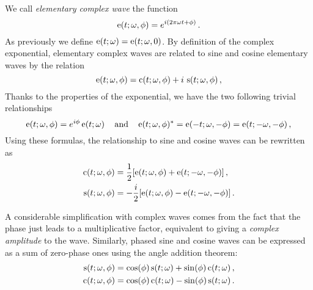 \begin{definition}
  \label{def:complex-wave}
  We call \emph{elementary complex wave} the function
  \begin{equation}
    \operatorname{e}(t;\omega,\phi)=e^{i(2\pi\omega t + \phi)}\,.
  \end{equation}
  As previously we define $\operatorname{e}(t;\omega)=\operatorname{e}(t;\omega,0)$. By definition of the complex
  exponential, elementary complex waves are related to sine and cosine elementary waves by
  the relation
  \begin{equation}
    \operatorname{e}(t;\omega,\phi)=\operatorname{c}(t;\omega,\phi)+i\,\operatorname{s}(t;\omega,\phi)\,,
  \end{equation}
  Thanks to the properties of the exponential, we have the two following trivial
  relationships
  \begin{equation}
    \operatorname{e}(t;\omega,\phi)=e^{i\phi}\operatorname{e}(t;\omega)\,\quad\text{and}\quad
    \operatorname{e}(t;\omega,\phi)^*=\operatorname{e}(-t;\omega,-\phi)=\operatorname{e}(t;-\omega,-\phi)\,,\label{eq:cw-conj}
  \end{equation}
  Using these formulas, the
  relationship to sine and cosine waves can be rewritten as
  \begin{align}
    \operatorname{c}(t;\omega,\phi)&=\frac{1}{2}[\operatorname{e}(t;\omega,\phi)+\operatorname{e}(t;-\omega,-\phi)]\,,
    \label{eq:cwtoew}\\
    \operatorname{s}(t;\omega,\phi)&=-\frac{i}{2}[\operatorname{e}(t;\omega,\phi)-\operatorname{e}(t;-\omega,-\phi)]\,.
    \label{eq:swtoew}
  \end{align}
\end{definition}
A considerable simplification with complex waves comes from the fact that the phase
just leads to a multiplicative factor, equivalent to giving a \emph{complex amplitude} to the wave.
Similarly, phased sine and cosine waves can be expressed as a sum of zero-phase ones using
the angle addition theorem:
\begin{align}
  \operatorname{s}(t;\omega,\phi)&=\cos(\phi)\operatorname{s}(t;\omega)+\sin(\phi)\operatorname{c}(t;\omega)\,,\\
  \operatorname{c}(t;\omega,\phi)&=\cos(\phi)\operatorname{c}(t;\omega)-\sin(\phi)\operatorname{s}(t;\omega)\,.
\end{align}
